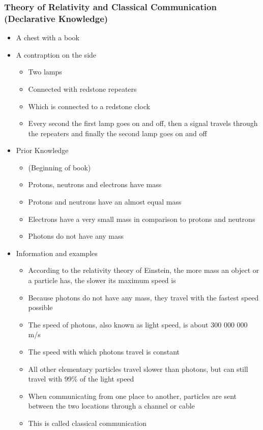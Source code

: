\documentclass[11pt,twoside]{report} %
\begin{document}
\subsubsection{Theory of Relativity and Classical Communication (Declarative Knowledge)}
	\begin{itemize}
		\item A chest with a book
		\item A contraption on the side
		\begin{itemize}
			\item Two lamps
			\item Connected with redstone repeaters
			\item Which is connected to a redstone clock
			\item Every second the first lamp goes on and off, then a signal travels through the repeaters and finally the second lamp goes on and off
		\end{itemize}
		\item Prior Knowledge
		\begin{itemize}
			\item (Beginning of book)
			\item Protons, neutrons and electrons have mass
			\item Protons and neutrons have an almost equal mass
			\item Electrons have a very small mass in comparison to protons and neutrons
			\item Photons do not have any mass
		\end{itemize}
		\item Information and examples
		\begin{itemize}
			\item According to the relativity theory of Einstein, the more mass an object or a particle has, the slower its maximum speed is
			\item Because photons do not have any mass, they travel with the fastest speed possible
			\item The speed of photons, also known as light speed, is about 300 000 000 m/s
			\item The speed with which photons travel is constant
			\item All other elementary particles travel slower than photons, but can still travel with 99\% of the light speed
			\item When communicating from one place to another, particles are sent between the two locations through a channel or cable
			\item This is called classical communication

\end{itemize}
\end{itemize}
\end{document}
